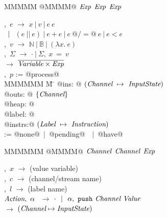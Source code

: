 
\begin{figure}
\begin{minipage}[t]{0.4\textwidth}
\begin{tabbing}
MMMMM \TABDEF @MMMM@  \TABSKIP $\textit{Exp}$ \TABSKIP $\textit{Exp}$ \TABSKIP $\textit{Exp}$ \kill

\Exp,~$e$               \> $\to$ \> $x~|~v~|~e~e $ \\
                        \> $\enskip|~$ \> $ (e~||~e) ~|~ e+e ~|~ e~@/=@~e ~|~ e < e$ \\
\Value,~$v$             \> $\to$ \> $\mathbb{N}~|~\mathbb{B}~|~(\lambda{}x.~e)$ \\
\Heap,~$\Sigma$         \> $\to$ \> $\cdot~|~\Sigma,~x~=~v$ \\[0.5em]
\Updates                \> $\to$ \> $\overline{\textit{Variable} \times \textit{Exp}}$
\\[0.5em]

\Proc,~$p$ \>:=\> @process@ \\
MMMMMM \= M \= \kill
\> \> @ins:   @  $(\textit{Channel} ~\mapsto~ \textit{InputState})$ \\
\> \> @outs:  @  $\{ \textit{Channel} \}$ \\
\> \> @heap:  @  \Heap \\
\> \> @label: @  \Label \\
\> \> @instrs:@  $(\textit{Label} ~\mapsto~ \textit{Instruction})$ 
\\[0.5em]
\InputState \> := \> @none@~$|$~@pending@~\Value~$|$~@have@

\end{tabbing}
\end{minipage}
\begin{minipage}[t]{0.05\textwidth}
\quad
\end{minipage}
\begin{minipage}[t]{0.4\textwidth}
\begin{tabbing}
MMMMMM \TABDEF @MMMM@  \TABSKIP $\textit{Channel}$ \TABSKIP $\textit{Channel}$ \TABSKIP $\textit{Exp}$ \kill

\Var,~$x$               \> $\to$ \> (value variable) \\
\Chan,~$c$              \> $\to$ \> (channel/stream name) \\
\Label,~$l$             \> $\to$ \> (label name) \\
$\textit{Action},~\alpha~$      \> $\to$ \> $\cdot ~~|~~ \alpha,~ \texttt{push}~\textit{Channel}~\textit{Value}$ \\[0.5em]
\ChannelStates          \> $\to$ \> $(\textit{Channel} \mapsto \textit{InputState})$ 
\\[0.5em]


\end{tabbing}
\end{minipage}
\end{figure}
